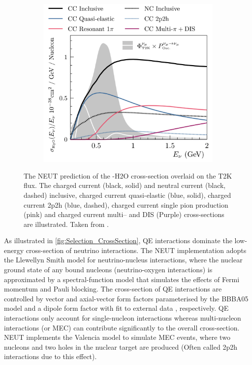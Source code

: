 \begin{figure}[h]
  \begin{subfigure}[t]{0.8\textwidth}
    \includegraphics[width=\textwidth, trim={0mm 0mm 0mm 0mm}, clip,page=1]{Figures/Selections/NEUTCrossSection.pdf}
  \end{subfigure}
  \caption{The NEUT prediction of the \quickmath{\nu_{\mu}}-H2O cross-section overlaid on the T2K \quickmath{\nu_{\mu}} flux. The charged current (black, solid) and neutral current (black, dashed) inclusive, charged current quasi-elastic (blue, solid), charged current 2p2h (blue, dashed), charged current single pion production (pink) and charged current multi--\quickmath{\pi} and DIS (Purple) cross-sections are illustrated. Taken from \cite{Hayato2021}.}
  \label{fig:Selection_CrossSection}
\end{figure}

As illustrated in \autoref{fig:Selection_CrossSection}, QE interactions dominate the low-energy cross-section of neutrino interactions. The NEUT implementation adopts the Llewellyn Smith \cite{llewelyn-smith} model for neutrino-nucleus interactions, where the nuclear ground state of any bound nucleons (neutrino-oxygen interactions) is approximated by a spectral-function \cite{Benhar1989} model that simulates the effects of Fermi momentum and Pauli blocking. The cross-section of QE interactions are controlled by vector and axial-vector form factors parameterised by the BBBA05 \cite{bbba05} model and a dipole form factor with  fit to external data \cite{Aguilar_Arevalo_2010}, respectively. QE interactions only account for single-nucleon interactions whereas multi-nucleon interactions (or MEC) can contribute significantly to the overall cross-section. NEUT implements the Valencia \cite{nieves2} model to simulate MEC events, where two nucleons and two holes in the nuclear target are produced (Often called 2p2h interactions due to this effect).

